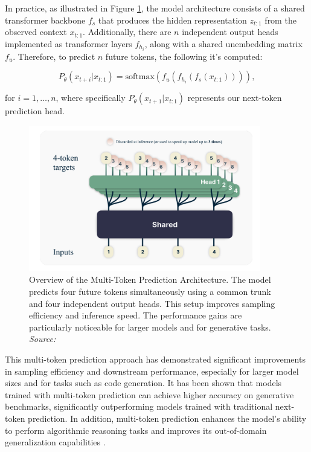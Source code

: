 In practice, as illustrated in Figure \ref{fig:multi-token-prediction}, the model architecture consists of a shared transformer backbone \( f_s \) that produces the hidden representation \( z_{t:1} \) from the observed context \( x_{t:1} \). Additionally, there are \( n \) independent output heads implemented as transformer layers \( f_{h_i} \), along with a shared unembedding matrix \( f_u \). Therefore, to predict \( n \) future tokens, the following it's computed:

\begin{equation}
    P_\theta(x_{t+i} | x_{t:1}) = \text{softmax}(f_u(f_{h_i}(f_s(x_{t:1})))),
\end{equation}

for \( i = 1, \ldots, n \), where specifically \( P_\theta(x_{t+1} | x_{t:1}) \) represents our next-token prediction head.

\begin{figure}[h]
    \centering
    \includegraphics[width=0.9\textwidth]{images/llms/multi-token-pred-architecture.png}
    \caption{Overview of the Multi-Token Prediction Architecture. The model predicts four future tokens simultaneously using a common trunk and four independent output heads. This setup improves sampling efficiency and inference speed. The performance gains are particularly noticeable for larger models and for generative tasks. \textit{Source:} \cite{gloeckle2024better}}
    \label{fig:multi-token-prediction}
\end{figure}

This multi-token prediction approach has demonstrated significant improvements in sampling efficiency and downstream performance, especially for larger model sizes and for tasks such as code generation. It has been shown that models trained with multi-token prediction can achieve higher accuracy on generative benchmarks, significantly outperforming models trained with traditional next-token prediction. In addition, multi-token prediction enhances the model's ability to perform algorithmic reasoning tasks and improves its out-of-domain generalization capabilities \cite{gloeckle2024better}.

